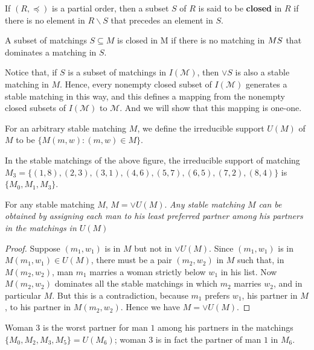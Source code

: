 If $(R, \preceq)$ is a partial order, then a subset $S$ of $R$ is said to be \textbf{closed} in $R$ if there is no element in $R\backslash S$ that precedes an element in $S$.

A subset of matchings $S \subseteq M$ is closed in M if there is no matching in $M \\ S$ that dominates a matching in $S$.

Notice that, if $S$ is a subset of matchings in $I(\mathcal{M})$, then $\vee S$ is also a stable matching in $M$. Hence, every nonempty closed subset of $I(\mathcal{M})$ generates a stable matching in this way, and this defines a mapping from the nonempty closed subsets of $I(\mathcal{M})$ to $\mathcal{M}$. And we will show that this mapping is one-one.

For an arbitrary stable matching $M$, we define the irreducible support $U(M)$ of $M$ to be
$\{M(m, w) : (m, w) \in M\}$. 

\begin{exmp}\label{exmp_2_1}
    In the stable matchings of the above figure, the irreducible support of matching $M_3 = \{(1, 8),(2, 3),(3, 1),(4, 6),(5, 7),(6, 5),(7, 2),(8, 4)\}$ is $\{M_0, M_1, M_3\}$.
\end{exmp}

\begin{lemma}
\label{lem_2_1}
For any stable matching $M$, $M = \vee U(M)$.
\newline
\newline
\textit{{\small Any stable matching $M$ can be obtained by assigning each man to his least preferred partner among his partners in the matchings in $U(M)$}}
\end{lemma}

\begin{proof}
    Suppose $(m_1, w_1)$ is in $M$ but not in $\vee U(M)$. Since $(m_1, w_1)$ is in $M(m_1, w_1) \in U(M)$, there must be a pair $(m_2, w_2)$ in $M$ such that, in $M(m_2, w_2)$, man $m_1$ marries a woman strictly below $w_1$ in his list. Now $M(m_2, w_2)$ dominates all the stable matchings in which $m_2$ marries $w_2$, and in particular $M$. But this is a contradiction, because $m_1$ prefers $w_1$, his partner in $M$, to his partner in $M(m_2, w_2)$. Hence we have $M = \vee U(M)$.
\end{proof}

\begin{exmp}\label{exmp_2_2}
Woman $3$ is the worst partner for man $1$ among his partners in the matchings $\{M_0, M_2, M_3, M_5\} = U(M_6)$; woman $3$ is in fact the partner of man $1$ in $M_6$.
\end{exmp}

